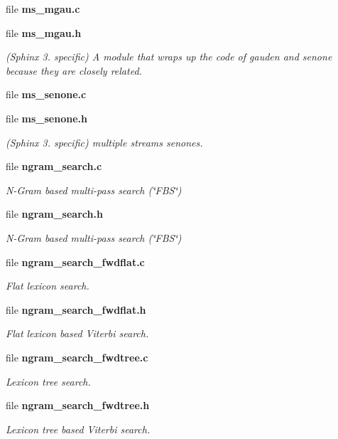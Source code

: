 \begin{DoxyCompactItemize}
file {\bfseries ms\-\_\-mgau.\-c}
\item 
file {\bf ms\-\_\-mgau.\-h}
\begin{DoxyCompactList}\small\item\em (Sphinx 3. specific) A module that wraps up the code of gauden and senone because they are closely related. \end{DoxyCompactList}\item 
file {\bfseries ms\-\_\-senone.\-c}
\item 
file {\bf ms\-\_\-senone.\-h}
\begin{DoxyCompactList}\small\item\em (Sphinx 3. specific) multiple streams senones. \end{DoxyCompactList}\item 
file {\bf ngram\-\_\-search.\-c}
\begin{DoxyCompactList}\small\item\em N-\/\-Gram based multi-\/pass search (\char`\"{}\-F\-B\-S\char`\"{}) \end{DoxyCompactList}\item 
file {\bf ngram\-\_\-search.\-h}
\begin{DoxyCompactList}\small\item\em N-\/\-Gram based multi-\/pass search (\char`\"{}\-F\-B\-S\char`\"{}) \end{DoxyCompactList}\item 
file {\bf ngram\-\_\-search\-\_\-fwdflat.\-c}
\begin{DoxyCompactList}\small\item\em Flat lexicon search. \end{DoxyCompactList}\item 
file {\bf ngram\-\_\-search\-\_\-fwdflat.\-h}
\begin{DoxyCompactList}\small\item\em Flat lexicon based Viterbi search. \end{DoxyCompactList}\item 
file {\bf ngram\-\_\-search\-\_\-fwdtree.\-c}
\begin{DoxyCompactList}\small\item\em Lexicon tree search. \end{DoxyCompactList}\item 
file {\bf ngram\-\_\-search\-\_\-fwdtree.\-h}
\begin{DoxyCompactList}\small\item\em Lexicon tree based Viterbi search. \end{DoxyCompactList}\item 

\end{DoxyCompactItemize}
